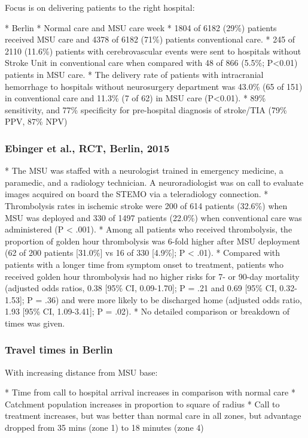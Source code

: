 Focus is on delivering patients to the right hospital:

\begin{markdown}
* Berlin
* Normal care and MSU care week
* 1804 of 6182 (29\%) patients received MSU care and 4378 of 6182 (71\%) patients conventional care.
* 245 of 2110 (11.6\%) patients with cerebrovascular events were sent to hospitals without Stroke Unit in conventional care when compared with 48 of 866 (5.5\%; P<0.01) patients in MSU care.
* The delivery rate of patients with intracranial hemorrhage to hospitals without neurosurgery department was 43.0\% (65 of 151) in conventional care and 11.3\% (7 of 62) in MSU care (P<0.01).
* 89\% sensitivity, and 77\% specificity for pre-hospital diagnosis of stroke/TIA (79\% PPV, 87\% NPV)
\end{markdown}

\subsubsection{Ebinger et al., RCT, Berlin, 2015 \cite{ebinger_effects_2015}}

* The MSU was staffed with a neurologist trained in emergency medicine, a
paramedic, and a radiology technician. A neuroradiologist was on call to evaluate images acquired on board the STEMO via a teleradiology connection.
* Thrombolysis rates in ischemic stroke were 200 of 614 patients (32.6\%) when MSU was deployed and 330 of 1497 patients (22.0\%) when conventional care was administered (P < .001).
* Among all patients who received thrombolysis, the proportion of golden hour thrombolysis was 6-fold higher after MSU deployment (62 of 200 patients [31.0\%] vs 16 of 330 [4.9\%]; P < .01).
* Compared with patients with a longer time from symptom onset to treatment, patients who received golden hour thrombolysis had no higher risks for 7- or 90-day mortality (adjusted odds ratios, 0.38 [95\% CI, 0.09-1.70]; P = .21 and 0.69 [95\% CI, 0.32-1.53]; P = .36) and were more likely to be discharged home (adjusted odds ratio, 1.93 [95\% CI, 1.09-3.41]; P = .02).
* No detailed comparison or breakdown of times was given.

\subsubsection{Travel times in Berlin \cite{koch_influence_2016}}

With increasing distance from MSU base:

* Time from call to hospital arrival increases in comparison with normal care
* Catchment population increases in proportion to square of radius
* Call to treatment increases, but was better than normal care in all zones, but advantage dropped from 35 mins (zone 1) to 18 minutes (zone 4)

